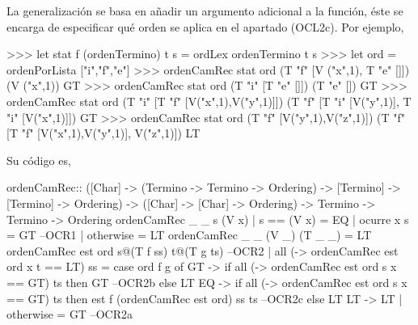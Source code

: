 La generalización se basa en añadir un argumento adicional a la
función, éste se encarga de especificar qué orden se aplica en el
apartado (OCL2c). Por ejemplo, 

\begin{sesion}
>>> let stat f (ordenTermino) t s = ordLex ordenTermino t s 
>>> let ord = ordenPorLista ["i","f","e"]
>>> ordenCamRec stat ord (T "f" [V ("x",1), T "e" []]) (V ("x",1))
GT
>>> ordenCamRec stat ord (T "i" [T "e" []]) (T "e" [])
GT
>>> ordenCamRec stat ord (T "i" [T "f" [V("x",1),V("y",1)]])
                           (T "f" [T "i" [V("y",1)], T "i" [V("x",1)]])
GT
>>> ordenCamRec stat ord (T "f" [V("y",1),V("z",1)])
                           (T "f" [T "f" [V("x",1),V("y",1)], V("z",1)])
LT
\end{sesion}

Su código es,

\begin{codigo}
ordenCamRec:: ([Char] -> (Termino -> Termino -> Ordering)
                      -> [Termino] -> [Termino] -> Ordering)
           ->  ([Char] -> [Char] -> Ordering)
           -> Termino
           -> Termino
           -> Ordering
ordenCamRec _ _ s (V x)
  | s == (V x) = EQ
  | ocurre x s = GT --OCR1
  | otherwise = LT
ordenCamRec _ _ (V _) (T _ _) = LT
ordenCamRec est ord s@(T f ss) t@(T g ts) --OCR2
  | all (\x -> ordenCamRec est ord x t == LT) ss
    = case ord f g of
      GT -> if all (\x -> ordenCamRec est ord s x == GT) ts
            then GT --OCR2b
            else LT
      EQ -> if all (\x -> ordenCamRec est ord s x == GT) ts
            then est f (ordenCamRec est ord) ss ts --OCR2c
            else LT
      LT -> LT
  | otherwise = GT --OCR2a
\end{codigo}

